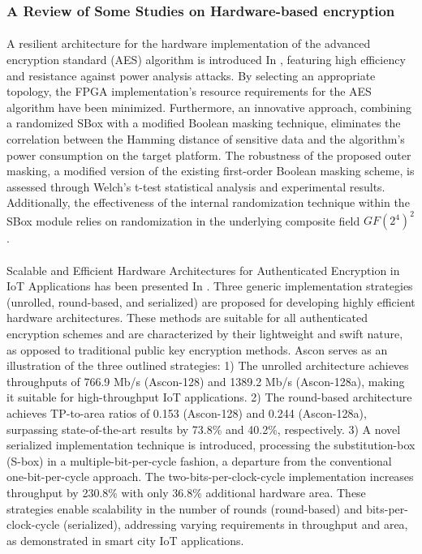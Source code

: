 \subsubsection{A Review of Some Studies on Hardware-based encryption}
\paragraph*{}
A resilient architecture for the hardware implementation of the advanced encryption standard (AES) algorithm is introduced In \cite{MASOUMI2019102371}, featuring high efficiency and resistance against power analysis attacks. By selecting an appropriate topology, the FPGA implementation's resource requirements for the AES algorithm have been minimized. Furthermore, an innovative approach, combining a randomized SBox with a modified Boolean masking technique, eliminates the correlation between the Hamming distance of sensitive data and the algorithm's power consumption on the target platform. The robustness of the proposed outer masking, a modified version of the existing first-order Boolean masking scheme, is assessed through Welch's t-test statistical analysis and experimental results. Additionally, the effectiveness of the internal randomization technique within the SBox module relies on randomization in the underlying composite field $GF(2^{4})^{2}$. 
\paragraph*{}
Scalable and Efficient Hardware Architectures for Authenticated Encryption in IoT Applications has been presented In \cite{9326396}. Three generic implementation strategies (unrolled, round-based, and serialized) are proposed for developing highly efficient hardware architectures. These methods are suitable for all authenticated encryption schemes and are characterized by their lightweight and swift nature, as opposed to traditional public key encryption methods. Ascon serves as an illustration of the three outlined strategies: 1) The unrolled architecture achieves throughputs of 766.9 Mb/s (Ascon-128) and 1389.2 Mb/s (Ascon-128a), making it suitable for high-throughput IoT applications. 2) The round-based architecture achieves TP-to-area ratios of 0.153 (Ascon-128) and 0.244 (Ascon-128a), surpassing state-of-the-art results by 73.8\% and 40.2\%, respectively. 3) A novel serialized implementation technique is introduced, processing the substitution-box (S-box) in a multiple-bit-per-cycle fashion, a departure from the conventional one-bit-per-cycle approach. The two-bits-per-clock-cycle implementation increases throughput by 230.8\% with only 36.8\% additional hardware area. These strategies enable scalability in the number of rounds (round-based) and bits-per-clock-cycle (serialized), addressing varying requirements in throughput and area, as demonstrated in smart city IoT applications.
